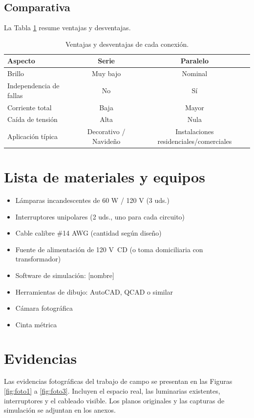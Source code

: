 \subsection{Comparativa}
La Tabla \ref{tab:comparativa} resume ventajas y desventajas.

\begin{table}[h]
\centering
\caption{Ventajas y desventajas de cada conexión.}
\label{tab:comparativa}
\begin{tabular}{|l|c|c|}
\hline
\textbf{Aspecto} & \textbf{Serie} & \textbf{Paralelo} \\
\hline
Brillo & Muy bajo & Nominal \\
Independencia de fallas & No & Sí \\
Corriente total & Baja & Mayor \\
Caída de tensión & Alta & Nula \\
Aplicación típica & Decorativo / Navideño & Instalaciones residenciales/comerciales \\
\hline
\end{tabular}
\end{table}

\section{Lista de materiales y equipos}
\begin{itemize}
    \item Lámparas incandescentes de 60 W / 120 V (3 uds.)
    \item Interruptores unipolares (2 uds., uno para cada circuito)
    \item Cable calibre \#14 AWG (cantidad según diseño)
    \item Fuente de alimentación de 120 V~CD (o toma domiciliaria con transformador)
    \item Software de simulación: [nombre]
    \item Herramientas de dibujo: AutoCAD, QCAD o similar
    \item Cámara fotográfica
    \item Cinta métrica
\end{itemize}

\section{Evidencias}
Las evidencias fotográficas del trabajo de campo se presentan en las Figuras \ref{fig:foto1} a \ref{fig:foto3}. Incluyen el espacio real, las luminarias existentes, interruptores y el cableado visible. Los planos originales y las capturas de simulación se adjuntan en los anexos.

